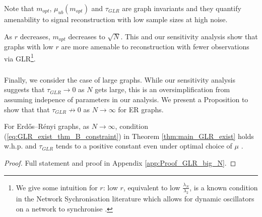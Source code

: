 {Note that $m_{opt}$, $\mu_{ub}(m_{opt})$ and $\tau_{GLR}$ are graph invariants and they quantify amenability to signal reconstruction with low sample sizes at high noise. 

As $r$ decreases, $m_{opt}$ decreases to $\sqrt{N}$. This and our sensitivity analysis show that graphs with low $r$ are more amenable to reconstruction with fewer observations via GLR\footnote{We give some intuition for $r$: low $r$, equivalent to low $\frac{\lambda_{N}}{\lambda_{2}}$, is a known condition in the Network Sychronisation literature which allows for dynamic oscillators on a network to synchronise \cite{barahona2002synchronization}.}. %
\fi

\subsubsection{}
Finally, we consider the case of large graphs. While our sensitivity analysis suggests that $\tau_{GLR} \to 0$ as $N$ gets large, this is an oversimplification from assuming indepence of parameters in our analysis. We present a Proposition to show that that $\tau_{GLR} \not\to 0$ as $N \to \infty$ for ER graphs.
\begin{propn}
\label{propn:GLR_big_N}
For Erdős–Rényi graphs, as $N \to \infty$, condition (\ref{eq:GLR_exist_thm_B_constraint}) in Theorem \ref{thm:main_GLR_exist} holds w.h.p. and $\tau_{GLR}$ tends to a positive constant even under optimal choice of $\mu$ \cite{chen2017GLRbias}.
\end{propn}
\begin{proof}
    Full statement and proof in Appendix 
 \ref{app:Proof_GLR_big_N}.
\end{proof}

}
